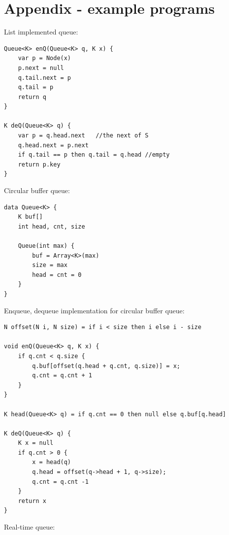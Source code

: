 \documentclass[b5paper]{article}
\begin{document}
\section{Appendix - example programs}

List implemented queue:

\begin{lstlisting}[language = Bourbaki]
Queue<K> enQ(Queue<K> q, K x) {
    var p = Node(x)
    p.next = null
    q.tail.next = p
    q.tail = p
    return q
}

K deQ(Queue<K> q) {
    var p = q.head.next   //the next of S
    q.head.next = p.next
    if q.tail == p then q.tail = q.head //empty
    return p.key
}
\end{lstlisting}

Circular buffer queue:

\begin{lstlisting}[language = Bourbaki]
data Queue<K> {
    K buf[]
    int head, cnt, size

    Queue(int max) {
        buf = Array<K>(max)
        size = max
        head = cnt = 0
    }
}
\end{lstlisting}

Enqueue, dequeue implementation for circular buffer queue:

\begin{lstlisting}
N offset(N i, N size) = if i < size then i else i - size

void enQ(Queue<K> q, K x) {
    if q.cnt < q.size {
        q.buf[offset(q.head + q.cnt, q.size)] = x;
        q.cnt = q.cnt + 1
    }
}

K head(Queue<K> q) = if q.cnt == 0 then null else q.buf[q.head]

K deQ(Queue<K> q) {
    K x = null
    if q.cnt > 0 {
        x = head(q)
        q.head = offset(q->head + 1, q->size);
        q.cnt = q.cnt -1
    }
    return x
}
\end{lstlisting}

Real-time queue:
\end{document}

